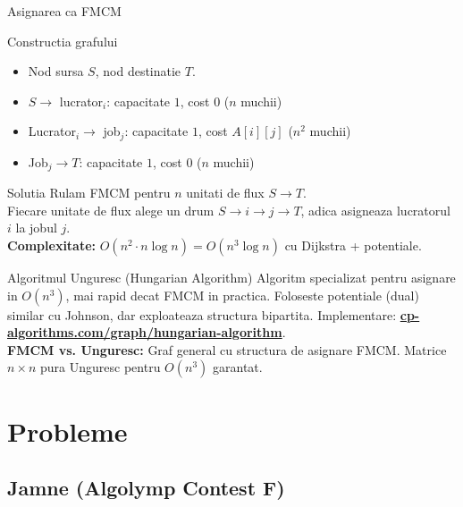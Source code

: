 ﻿\documentclass[9pt]{beamer}
\begin{document}
\begin{frame}[shrink]{Asignarea ca FMCM}
  \begin{block}{Constructia grafului}
    \begin{itemize}\footnotesize\itemsep2pt
      \item Nod sursa $S$, nod destinatie $T$.
      \item $S \to$ lucrator$_i$: capacitate $1$, cost $0$ \quad ($n$ muchii)
      \item Lucrator$_i \to$ job$_j$: capacitate $1$, cost $A[i][j]$ \quad ($n^2$ muchii)
      \item Job$_j \to T$: capacitate $1$, cost $0$ \quad ($n$ muchii)
    \end{itemize}
  \end{block}
  \begin{block}{Solutia}
    Rulam FMCM pentru $n$ unitati de flux $S\to T$.\\
    Fiecare unitate de flux alege un drum $S\to i\to j\to T$,
    adica asigneaza lucratorul $i$ la jobul $j$.\\[3pt]
    \footnotesize
    \textbf{Complexitate:} $O(n^2 \cdot n\log n) = O(n^3 \log n)$ cu Dijkstra + potentiale.
  \end{block}
  \begin{alertblock}{Algoritmul Unguresc (Hungarian Algorithm)}
    \footnotesize
    Algoritm specializat pentru asignare in $O(n^3)$, mai rapid decat FMCM in practica.
    Foloseste potentiale (dual) similar cu Johnson, dar exploateaza structura bipartita.
    Implementare: \href{https://cp-algorithms.com/graph/hungarian-algorithm.html}{\textbf{cp-algorithms.com/graph/hungarian-algorithm}}.\\[2pt]
    \textbf{FMCM vs. Unguresc:}
    Graf general cu structura de asignare \textemdash{} FMCM.
    Matrice $n\times n$ pura \textemdash{} Unguresc pentru $O(n^3)$ garantat.
  \end{alertblock}
\end{frame}

\section{Probleme}

\subsection*{Jamne (Algolymp Contest F)}
\end{document}
